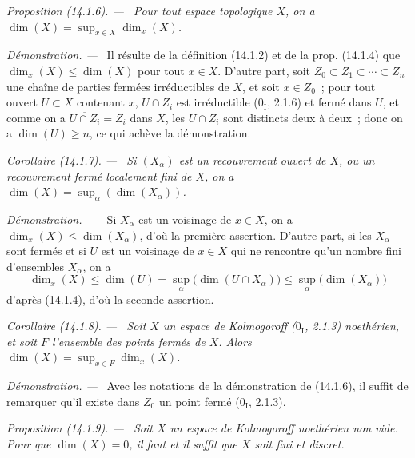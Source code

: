 \documentclass[10pt,oneside]{book}
\makeatletter
\newcommand{\setmanualcurrentlabel}[1]{\def\@currentlabel{#1}}
\newenvironment{proposition}[1][]{%
  \setmanualcurrentlabel{#1}\par\medskip\noindent\itshape Proposition (#1). ---\ }{\par}
\newenvironment{corollary}[1][]{%
  \setmanualcurrentlabel{#1}\par\medskip\noindent\itshape Corollaire (#1). ---\ }{\par}
\newenvironment{proof}{%
  \par\medskip\noindent\textit{Démonstration. ---\ }}{\par}
\makeatother
\begin{document}
\begin{proposition}[14.1.6]
\label{0.14.1.6-fr}
Pour tout espace topologique $X$, on a
$\dim(X)=\sup_{x\in X}\dim_x(X)$.
\end{proposition}

\begin{proof}
Il résulte de la définition (14.1.2) et de la prop. (14.1.4) que
$\dim_x(X)\leq\dim(X)$ pour tout $x\in X$. D'autre part, soit
$Z_0\subset Z_1\subset\cdots\subset Z_n$ une chaîne de parties fermées
irréductibles de $X$, et soit $x\in Z_0$~; pour tout ouvert $U\subset X$
contenant $x$, $U\cap Z_i$ est irréductible ($0_{\mathrm I}$, 2.1.6) et
fermé dans $U$, et comme on a $\overline{U\cap Z_i}=Z_i$ dans $X$, les
$U\cap Z_i$ sont distincts deux à deux~; donc on a $\dim(U)\geq n$, ce qui
achève la démonstration.
\end{proof}

\begin{corollary}[14.1.7]
\label{0.14.1.7-fr}
Si $(X_\alpha)$ est un recouvrement ouvert de $X$, ou un recouvrement fermé
localement fini de $X$, on a
$\dim(X)=\sup_\alpha(\dim(X_\alpha))$.
\end{corollary}

\begin{proof}
Si $X_\alpha$ est un voisinage de $x\in X$, on a
$\dim_x(X)\leq\dim(X_\alpha)$, d'où la première assertion. D'autre part, si
les $X_\alpha$ sont fermés et si $U$ est un voisinage de $x\in X$ qui ne
rencontre qu'un nombre fini d'ensembles $X_\alpha$, on a
\[
  \dim_x(X)\leq\dim(U)=\sup_\alpha\bigl(\dim(U\cap X_\alpha)\bigr)
  \leq\sup_\alpha\bigl(\dim(X_\alpha)\bigr)
\]
d'après (14.1.4), d'où la seconde assertion.
\end{proof}

\begin{corollary}[14.1.8]
\label{0.14.1.8-fr}
Soit $X$ un espace de Kolmogoroff ($0_{\mathrm I}$, 2.1.3) noethérien, et
soit $F$ l'ensemble des points fermés de $X$. Alors
$\dim(X)=\sup_{x\in F}\dim_x(X)$.
\end{corollary}

\begin{proof}
Avec les notations de la démonstration de (14.1.6), il suffit de remarquer
qu'il existe dans $Z_0$ un point fermé ($0_{\mathrm I}$, 2.1.3).
\end{proof}

\begin{proposition}[14.1.9]
\label{0.14.1.9-fr}
Soit $X$ un espace de Kolmogoroff noethérien non vide. Pour que
$\dim(X)=0$, il faut et il suffit que $X$ soit fini et discret.
\end{proposition}
\end{document}
